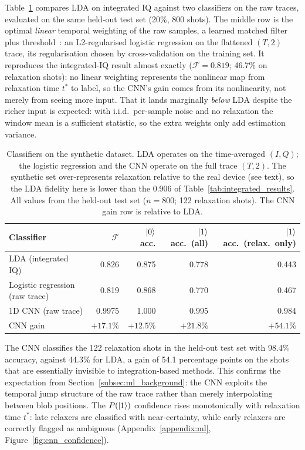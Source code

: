 Table~\ref{tab:cnn_results} compares LDA on integrated IQ against two classifiers
on the raw traces, evaluated on the same held-out test set (20\%, 800 shots).  The
middle row is the optimal \emph{linear} temporal weighting of the raw samples, a
learned matched filter plus threshold~\cite{Gambetta2007}: an L2-regularised
logistic regression on the flattened $(T,2)$ trace, its regularisation chosen by
cross-validation on the training set.  It reproduces the integrated-IQ result
almost exactly ($\mathcal{F} = 0.819$; 46.7\% on relaxation shots): no linear
weighting represents the nonlinear map from relaxation time $t^*$ to label, so the
CNN's gain comes from its nonlinearity, not merely from seeing more input.  That
it lands marginally \emph{below} LDA despite the richer input is expected: with
i.i.d.\ per-sample noise and no relaxation the window mean is a sufficient
statistic, so the extra weights only add estimation variance.

\begin{table}[ht]
\centering
\caption{Classifiers on the synthetic dataset.  LDA operates on the
         time-averaged $(I,Q)$; the logistic regression and the CNN operate on the
         full trace $(T,2)$.
         The synthetic set over-represents relaxation relative to the real device
         (see text), so the LDA fidelity here is lower than the 0.906 of
         Table~\ref{tab:integrated_results}.  All values from the held-out test
         set ($n = 800$; 122 relaxation shots).  The CNN gain row is relative to
         LDA.}
\label{tab:cnn_results}
\begin{tabular}{lrrrr}
\toprule
Classifier & $\mathcal{F}$ & $\ket{0}$ acc. & $\ket{1}$ acc.\ (all) &
             $\ket{1}$ acc.\ (relax.\ only) \\
\midrule
LDA (integrated IQ)  & 0.826  & 0.875 & 0.778 & 0.443 \\
Logistic regression (raw trace) & 0.819 & 0.868 & 0.770 & 0.467 \\
1D CNN (raw trace)   & 0.9975 & 1.000 & 0.995 & 0.984 \\
\midrule
CNN gain             & $+17.1\%$ & $+12.5\%$ & $+21.8\%$ & $+54.1\%$ \\
\bottomrule
\end{tabular}
\end{table}

The CNN classifies the 122 relaxation shots in the held-out test set with 98.4\%
accuracy, against 44.3\% for LDA, a gain of 54.1 percentage points on the shots
that are essentially invisible to integration-based methods.  This confirms the
expectation from Section~\ref{subsec:ml_background}: the CNN exploits the temporal
jump structure of the raw trace rather than merely interpolating between blob
positions.  The $P(\ket{1})$ confidence rises monotonically with relaxation time
$t^*$: late relaxers are classified with near-certainty, while early relaxers are
correctly flagged as ambiguous
(Appendix~\ref{appendix:ml}, Figure~\ref{fig:cnn_confidence}).

